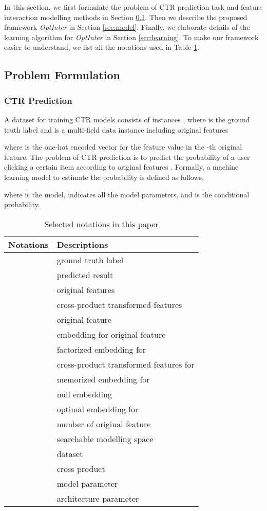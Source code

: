 \documentclass[conference]{IEEEtran}
\begin{document}
In this section, we first formulate the problem of CTR prediction task and feature interaction modelling methods in Section \ref{sec:problem}. Then we describe the proposed framework \textit{OptInter} in Section \ref{sec:model}. Finally, we elaborate details of the learning algorithm for \textit{OptInter} in Section \ref{sec:learning}. To make our framework easier to understand, we list all the notations used in Table \ref{Table:notation}.

\subsection{Problem Formulation}
\label{sec:problem}

\subsubsection{CTR Prediction}
A dataset for training CTR models consists of instances , where  is the ground truth label and  is a multi-field data instance including  original features

where  is the one-hot encoded vector for the feature value in the -th original feature. The problem of CTR prediction is to predict the probability of a user clicking a certain item according to original features . Formally, a machine learning model to estimate the probability is defined as follows,


where  is the model,  indicates all the model parameters, and  is the conditional probability.


\begin{table}[htbp]   
\renewcommand\arraystretch{1.15}
\centering
\caption{Selected notations in this paper}  
\begin{tabular}{l|l}    
\hline
\textbf{Notations} & \textbf{Descriptions} \\    
\hline
 & ground truth label\\
 & predicted result \\
 & original features\\
 &  cross-product transformed features \\
 & original feature  \\
 & embedding for original feature  \\
 & factorized embedding for  \\
 & cross-product transformed features for  \\
 & memorized embedding for  \\
 & null embedding \\
 & optimal embedding for  \\
 & number of original feature \\
 & searchable modelling space \\
 & dataset \\
 & cross product \\
 & model parameter \\
 & architecture parameter \\
\hline
\end{tabular}
\label{Table:notation}
\end{table}
\end{document}
